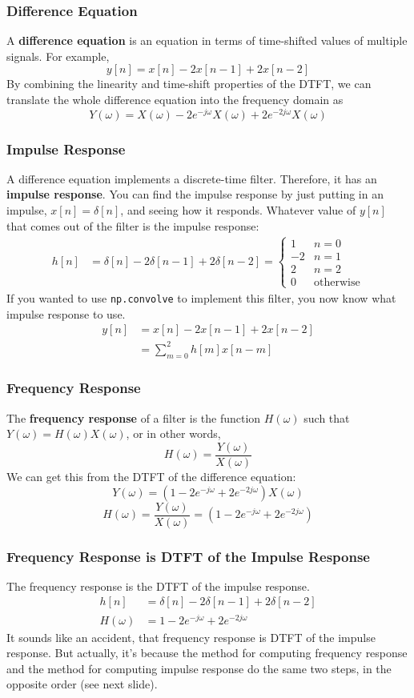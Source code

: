 \documentclass{beamer}
\begin{document}
\begin{frame}
  \frametitle{Difference Equation}

  A {\bf difference equation} is an equation in terms of time-shifted
  values of multiple signals.  For example,
  \[
  y[n] = x[n] - 2x[n-1] + 2x[n-2]
  \]
  By combining the linearity and time-shift properties of the DTFT, we
  can translate the whole difference equation into the frequency
  domain as
  \[
  Y(\omega)  = X(\omega) -2e^{-j\omega} X(\omega) + 2 e^{-2j\omega}X(\omega)
  \]
\end{frame}

\begin{frame}
  \frametitle{Impulse Response}

  A difference equation implements a discrete-time filter.  Therefore,
  it has an {\bf impulse response}.  You can find the impulse response
  by just putting in an impulse, $x[n]=\delta[n]$, and seeing how it
  responds.  Whatever value of $y[n]$ that comes out of the filter is
  the impulse response:
  \begin{align*}
    h[n] &= \delta[n]-2\delta[n-1]+2\delta[n-2]=\begin{cases}
    1 & n=0\\-2 & n=1\\2 & n=2\\0 & \mbox{otherwise}\end{cases}
  \end{align*}
  If you wanted to use {\tt np.convolve} to implement this filter, you
  now know what impulse response to use.
  \begin{align*}
    y[n] &= x[n] -2x[n-1]+2x[n-2]\\
    & = \sum_{m=0}^2 h[m]x[n-m]
  \end{align*}
\end{frame}  

\begin{frame}
  \frametitle{Frequency Response}

  The {\bf frequency response} of a filter is the function $H(\omega)$ such that
  $Y(\omega)=H(\omega)X(\omega)$, or in other words,
  \[
  H(\omega) = \frac{Y(\omega)}{X(\omega)}
  \]
  We can get this from the DTFT of the difference equation:
  \[
  Y(\omega)  = \left(1-2e^{-j\omega}+2e^{-2j\omega}\right) X(\omega)
  \]
  \[
  H(\omega) = \frac{Y(\omega)}{X(\omega)} = \left(1-2e^{-j\omega}+2e^{-2j\omega}\right)
  \]
\end{frame}

\begin{frame}
  \frametitle{Frequency Response is DTFT of the Impulse Response}

  The frequency response is the DTFT of the impulse response.
  \begin{align*}
    h[n] &= \delta[n]-2\delta[n-1]+2\delta[n-2]\\
    H(\omega) &= 1-2e^{-j\omega}+2e^{-2j\omega}
  \end{align*}
  It sounds like an accident, that frequency response is DTFT of the
  impulse response.  But actually, it's because the method for
  computing frequency response and the method for computing impulse
  response do the same two steps, in the opposite order (see next slide).
\end{frame}
\end{document}

